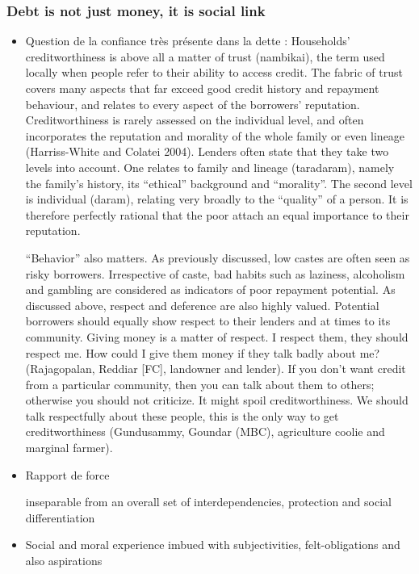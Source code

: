 \documentclass[a4paper, 11pt, onecolumn]{article}
\begin{document}
		\subsubsection{Debt is not just money, it is social link}
\begin{itemize}
\item Question de la confiance très présente dans la dette :
\cite{Guerin2014a} Households’ creditworthiness is above all a matter of trust (nambikai), the term used locally
when people refer to their ability to access credit. The fabric of trust covers many aspects that
far exceed good credit history and repayment behaviour, and relates to every aspect of the
borrowers’ reputation. Creditworthiness is rarely assessed on the individual level, and often
incorporates the reputation and morality of the whole family or even lineage (Harriss-White
and Colatei 2004). Lenders often state that they take two levels into account. One relates to
family and lineage (taradaram), namely the family’s history, its “ethical” background and
“morality”. The second level is individual (daram), relating very broadly to the “quality” of a
person. It is therefore perfectly rational that the poor attach an equal importance to their
reputation.

“Behavior” also matters. As previously discussed, low castes are often seen as risky
borrowers. Irrespective of caste, bad habits such as laziness, alcoholism and gambling are
considered as indicators of poor repayment potential. As discussed above, respect and deference are also highly valued. Potential borrowers should equally show respect to their
lenders and at times to its community.
Giving money is a matter of respect. I respect them, they should respect me. How could I give them
money if they talk badly about me? (Rajagopalan, Reddiar [FC], landowner and lender).
If you don’t want credit from a particular community, then you can talk about them to others; otherwise
you should not criticize. It might spoil creditworthiness. We should talk respectfully about these people,
this is the only way to get creditworthiness (Gundusammy, Goundar (MBC), agriculture coolie and
marginal farmer).

\item Rapport de force
\cite{Guerin2014}

\citep{Guerin2020a}
inseparable from an overall set of interdependencies, protection and social differentiation

\item Social and moral experience
imbued with subjectivities, felt-obligations and also aspirations


\end{itemize}
\end{document}
